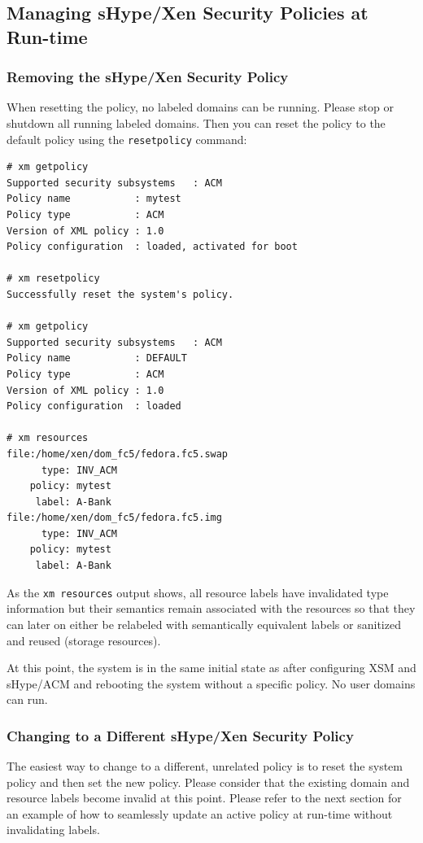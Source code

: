 \documentclass[11pt,twoside,final,openright]{report}
\begin{document}
\subsection{Managing sHype/Xen Security Policies at Run-time}
\label{subsection:acmpolicymanagement}

\subsubsection{Removing the sHype/Xen Security Policy}
When resetting the policy, no labeled domains can be running.
Please stop or shutdown all running labeled domains. Then you can reset
the policy to the default policy using the \verb|resetpolicy| command:

\begin{scriptsize}
\begin{verbatim}
# xm getpolicy
Supported security subsystems   : ACM
Policy name           : mytest
Policy type           : ACM
Version of XML policy : 1.0
Policy configuration  : loaded, activated for boot

# xm resetpolicy
Successfully reset the system's policy.

# xm getpolicy
Supported security subsystems   : ACM
Policy name           : DEFAULT
Policy type           : ACM
Version of XML policy : 1.0
Policy configuration  : loaded

# xm resources
file:/home/xen/dom_fc5/fedora.fc5.swap
      type: INV_ACM
    policy: mytest
     label: A-Bank
file:/home/xen/dom_fc5/fedora.fc5.img
      type: INV_ACM
    policy: mytest
     label: A-Bank
\end{verbatim}
\end{scriptsize}

As the \verb|xm resources| output shows, all resource labels have
invalidated type information but their semantics remain associated
with the resources so that they can later on either be relabeled
with semantically equivalent labels or sanitized and reused
(storage resources).

At this point, the system is in the same initial state as after
configuring XSM and sHype/ACM and rebooting the system without
a specific policy. No user domains can run.

\subsubsection{Changing to a Different sHype/Xen Security Policy}
The easiest way to change to a different, unrelated policy is to reset the system
policy and then set the new policy. Please consider that the existing
domain and resource labels become invalid at this point. Please refer
to the next section for an example of how to seamlessly update an
active policy at run-time without invalidating labels.
\end{document}
